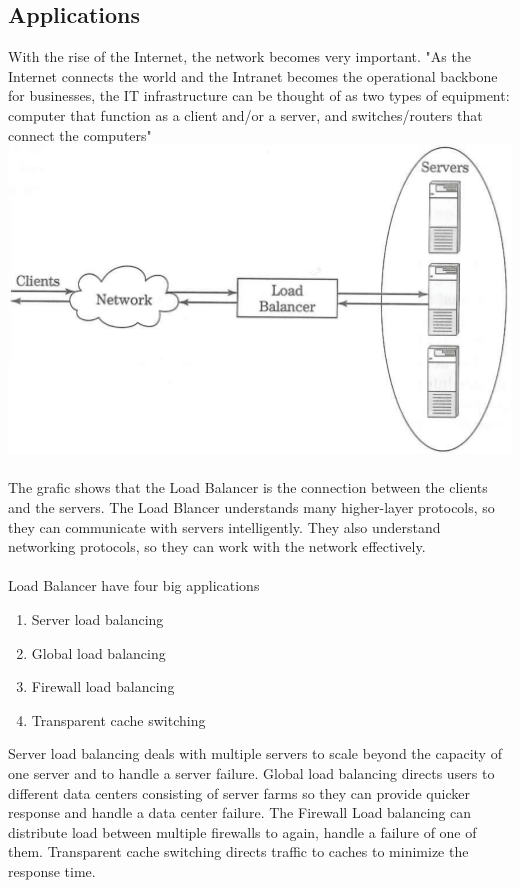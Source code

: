 \documentclass[12p]{article}
\begin{document}
	\subsection{Applications}
	With the rise of the Internet, the network becomes very important. "As the Internet connects the world and the Intranet becomes the operational backbone for businesses, the IT infrastructure can be thought of as two types of equipment: computer that function as a client and/or a server, and switches/routers that connect the computers"\cite{lb_SFC} \\
	\includegraphics[width=\textwidth]{basic}\cite{lb_SFC} \\\\
	The grafic shows that the Load Balancer is the connection between the clients and the servers. The Load Blancer understands many higher-layer protocols, so they can communicate with servers intelligently. They also understand networking protocols, so they can work with the network effectively.\\\\
	Load Balancer have four big applications
	\begin{enumerate}
		\item Server load balancing
		\item Global load balancing
		\item Firewall load balancing
		\item Transparent cache switching
	\end{enumerate} 
	Server load balancing deals with multiple servers to scale beyond the capacity of one server and to handle a server failure. Global load balancing directs users to different data centers consisting of server farms so they can provide quicker response and handle a data center failure. The Firewall Load balancing can distribute load between multiple firewalls to again, handle a failure of one of them. Transparent cache switching directs traffic to caches to minimize the response time. \\ \\
\end{document}
